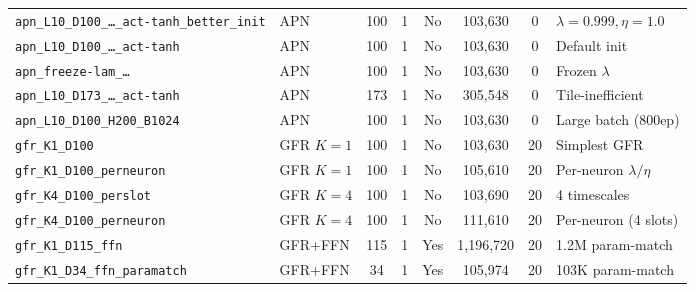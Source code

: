 \documentclass[11pt,a4paper]{article}
\begin{document}
\begin{table}[h]
{\begin{tabular}{llcccccl}
\texttt{apn\_L10\_D100\_\ldots\_act-tanh\_better\_init} & APN & 100 & 1 & No & 103,630 & 0 & $\lambda{=}0.999,\eta{=}1.0$ \\
\texttt{apn\_L10\_D100\_\ldots\_act-tanh} & APN & 100 & 1 & No & 103,630 & 0 & Default init \\
\texttt{apn\_freeze-lam\_\ldots} & APN & 100 & 1 & No & 103,630 & 0 & Frozen $\lambda$ \\
\texttt{apn\_L10\_D173\_\ldots\_act-tanh} & APN & 173 & 1 & No & 305,548 & 0 & Tile-inefficient \\
\texttt{apn\_L10\_D100\_H200\_B1024} & APN & 100 & 1 & No & 103,630 & 0 & Large batch (800ep) \\
\texttt{gfr\_K1\_D100} & GFR $K{=}1$ & 100 & 1 & No & 103,630 & 20 & Simplest GFR \\
\texttt{gfr\_K1\_D100\_perneuron} & GFR $K{=}1$ & 100 & 1 & No & 105,610 & 20 & Per-neuron $\lambda/\eta$ \\
\texttt{gfr\_K4\_D100\_perslot} & GFR $K{=}4$ & 100 & 1 & No & 103,690 & 20 & 4 timescales \\
\texttt{gfr\_K4\_D100\_perneuron} & GFR $K{=}4$ & 100 & 1 & No & 111,610 & 20 & Per-neuron (4 slots) \\
\texttt{gfr\_K1\_D115\_ffn} & GFR+FFN & 115 & 1 & Yes & 1,196,720 & 20 & 1.2M param-match \\
\texttt{gfr\_K1\_D34\_ffn\_paramatch} & GFR+FFN & 34 & 1 & Yes & 105,974 & 20 & 103K param-match \\
\bottomrule
\end{tabular}%
}
\end{table}
\end{document}
